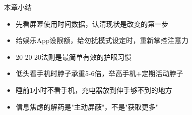 \begin{tcbsummary}{本章小结}
\begin{itemize}
  \item 先看屏幕使用时间数据，认清现状是改变的第一步
  \item 给娱乐App设限额，给勿扰模式设定时，重新掌控注意力
  \item 20-20-20法则是最简单有效的护眼习惯
  \item 低头看手机时脖子承重5-6倍，举高手机+定期活动脖子
  \item 睡前1小时不看手机，充电器放到伸手够不到的地方
  \item 信息焦虑的解药是"主动屏蔽"，不是"获取更多"
\end{itemize}

\end{tcbsummary}
